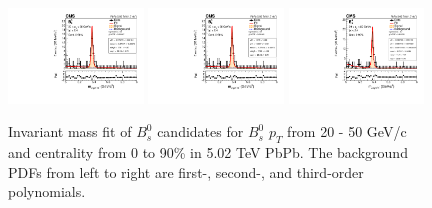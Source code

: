 \begin{figure}[hbtp]
\begin{center}
\includegraphics[width=0.32\textwidth]{Figures/Chapter5/data_PbPb_1_BptNew_2050_doubly0_0_90_background_1stEffInfoTreeFit.pdf}
\includegraphics[width=0.32\textwidth]{Figures/Chapter5/data_PbPb_1_BptNew_2050_doubly0_0_90_background_2ndEffInfoTreeFit.pdf}
\includegraphics[width=0.32\textwidth]{Figures/Chapter5/data_PbPb_1_BptNew_2050_doubly0_0_90_background_3rdEffInfoTreeFit.pdf}
\caption{Invariant mass fit of $B^0_s$ candidates for $B^0_s$ $p_T$ from 20 - 50 GeV/c and centrality from 0 to 90\% in 5.02 TeV PbPb. The background PDFs from left to right are first-, second-, and third-order polynomials.}
\label{BsBkgdVar}
\end{center}
\end{figure}


